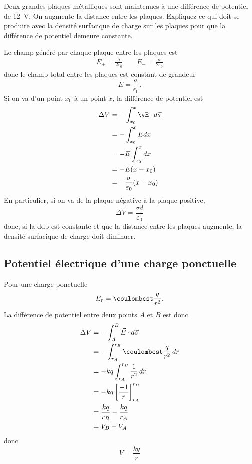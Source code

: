 Deux grandes plaques métalliques sont maintenues à une différence de potentiel
de \SI{12}{V}. On augmente la distance entre les plaques. Expliquez ce qui doit
se produire avec la densité surfacique de charge sur les plaques pour que la
différence de potentiel demeure constante.

\begin{center}
\end{center}

Le champ généré par chaque plaque entre les plaques est
\begin{align*}
  E_{+} = \frac{\sigma}{2 \varepsilon_0} \quad\quad E_{-} = \frac{\sigma}{2 \varepsilon_0}
\end{align*}
donc le champ total entre les plaques est constant de grandeur
\[
  E = \frac{\sigma}{\epsilon_0}.
\]
Si on va d'un point $x_0$ à un point $x$, la différence de potentiel est
\begin{align*}
  \Delta V &= - \int_{x_0}^x \vE \cdot d\vec{s}  \\
           &= - \int_{x_0}^x E dx  \\
           &= - E\int_{x_0}^x dx  \\
           &= - E (x - x_0) \\
           &= - \frac{\sigma}{\varepsilon_0} (x - x_0) \\
\end{align*}
En particulier, si on va de la plaque négative à la plaque positive,
\[\Delta V = \frac{\sigma d}{\varepsilon_0} \]
donc, si la ddp est constante et que la distance entre les plaques augmente,
la densité surfacique de charge doit diminuer.



\subsection*{Potentiel électrique d'une charge ponctuelle}

Pour une charge ponctuelle
\[
  E_r = \coulombcst \frac{q}{r^2}.
\]
La différence de potentiel entre deux points $A$ et $B$ est donc
\begin{align*}
  \Delta V &= -\int_A^B \vec{E}\cdot d\vec{s} \\
    &= -\int_{r_A}^{r_B} \coulombcst \frac{q}{r^2} \,dr \\
    &= -kq \int_{r_A}^{r_B} \frac{1}{r^2} \,dr \\
    &= -kq \left[ \frac{-1}{r} \right]_{r_A}^{r_B} \\
    &= \frac{kq}{r_B} - \frac{kq}{r_A} \\
    &= V_B - V_A
\end{align*}
donc
$$V = \frac{kq}{r}$$


